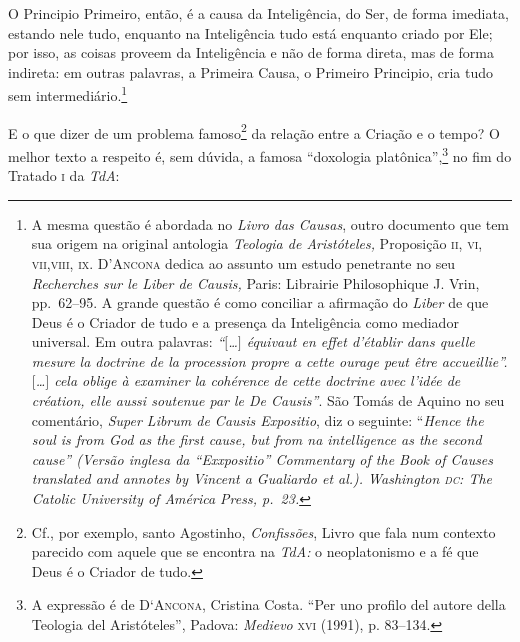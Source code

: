 O Principio Primeiro, então, é a causa da Inteligência, do Ser,
de forma imediata, estando nele tudo, enquanto na Inteligência
tudo está enquanto criado por Ele; por isso, as coisas proveem da
Inteligência e não de forma direta, mas de forma indireta: em
outras palavras, a Primeira Causa, o Primeiro Principio, cria
tudo sem intermediário.\footnote{ A mesma questão é abordada no
\emph{Livro das Causas}, outro documento que tem sua origem na
original antologia \emph{Teologia de Aristóteles,} 
Proposição \textsc{ii}, \textsc{vi}, \textsc{vii},\textsc{viii},
\textsc{ix}. \textsc{D'Ancona} 
dedica ao assunto um estudo penetrante no seu
\emph{Recherches sur le \emph{Liber de Causis},} Paris: Librairie
Philosophique J. Vrin, pp.~62--95. A grande questão é como conciliar
a afirmação do \emph{Liber} de que Deus é o Criador de tudo e a
presença da Inteligência como mediador universal. Em outra
palavras: \emph{“$[$\ldots{}$]$ équivaut en effet d'établir dans quelle
mesure la doctrine de la procession propre a cette ourage peut
être accueillie”. $[$\ldots{}$]$ cela oblige à examiner la cohérence de
cette doctrine avec l'idée de création, elle aussi soutenue par
le De Causis”}. São Tomás de Aquino no seu comentário, 
\emph{Super Librum de Causis Expositio}, diz o seguinte:
“\emph{Hence the soul is from God as the first cause, but from
na intelligence as the second cause”  (Versão inglesa da
“Exxpositio” Commentary of the Book of Causes translated and
annotes by Vincent a Gualiardo \emph{et al.}). Washington \textsc{dc}: The Catolic University of América
Press, p.~23.}}

E o que dizer de um problema famoso\footnote{ Cf., por
exemplo, santo Agostinho, \emph{Confissões}, Livro  que fala
num contexto parecido com aquele que se encontra na \emph{TdA:}
o neoplatonismo e a fé que Deus é o Criador de tudo.}
da relação entre a Criação e o tempo? O melhor texto a respeito
é, sem dúvida, a famosa “doxologia platônica”,\footnote{ A
expressão é de \textsc{D‘Ancona}, Cristina Costa. ``Per uno
profilo del autore della Teologia del Aristóteles'', Padova:
\emph{Medievo} \textsc{xvi} (1991), p. 83--134.} no fim do Tratado
\textsc{i} da
\emph{TdA}:

